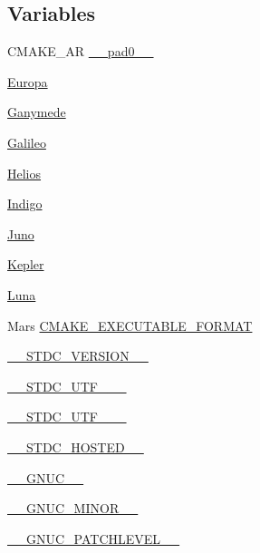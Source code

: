 \subsection*{Variables}
\begin{DoxyCompactItemize}
\item 
C\+M\+A\+K\+E\+\_\+\+AR \hyperlink{CMakeCache_8txt_a2b96b3598268f62908e4995dd2463817}{\+\_\+\+\_\+pad0\+\_\+\+\_\+}
\item 
\hyperlink{CMakeCache_8txt_af951d63fbd2687279cc11d69da292f84}{Europa}
\item 
\hyperlink{CMakeCache_8txt_a968842d0bd23649ddcb95bb35ee57943}{Ganymede}
\item 
\hyperlink{CMakeCache_8txt_a2b661fac6349ac2d6a6ff4f648ed0320}{Galileo}
\item 
\hyperlink{CMakeCache_8txt_ab16786d60187fbcb531b4443516567e1}{Helios}
\item 
\hyperlink{CMakeCache_8txt_a4f4af623496b1d087faf7dd53610d034}{Indigo}
\item 
\hyperlink{CMakeCache_8txt_a825301f1f1e1fc29d08c8697642b409b}{Juno}
\item 
\hyperlink{CMakeCache_8txt_a617415bd2b8666eca22af1168911ac78}{Kepler}
\item 
\hyperlink{CMakeCache_8txt_aa77580d5e01dbbd026207a21fccc6cda}{Luna}
\item 
Mars \hyperlink{CMakeCache_8txt_a84fcb39ad5095c6d2faadc7444971262}{C\+M\+A\+K\+E\+\_\+\+E\+X\+E\+C\+U\+T\+A\+B\+L\+E\+\_\+\+F\+O\+R\+M\+AT}
\item 
\hyperlink{CMakeCache_8txt_aba69e7d86e970c5454fedf7e25cbf49e}{\+\_\+\+\_\+\+S\+T\+D\+C\+\_\+\+V\+E\+R\+S\+I\+O\+N\+\_\+\+\_\+}
\item 
\hyperlink{CMakeCache_8txt_a391447bc12001cf307b9fec77d32c722}{\+\_\+\+\_\+\+S\+T\+D\+C\+\_\+\+U\+T\+F\+\_\+\_\+\+\_\+}
\item 
\hyperlink{CMakeCache_8txt_aebc193933efcf54801ba103bf6d12dbb}{\+\_\+\+\_\+\+S\+T\+D\+C\+\_\+\+U\+T\+F\+\_\+\_\+\+\_\+}
\item 
\hyperlink{CMakeCache_8txt_aacc78bc040f85bfc5d36eda8c048a1fe}{\+\_\+\+\_\+\+S\+T\+D\+C\+\_\+\+H\+O\+S\+T\+E\+D\+\_\+\+\_\+}
\item 
\hyperlink{CMakeCache_8txt_a4f955bfc59f2aa5f37123f7fa8c45974}{\+\_\+\+\_\+\+G\+N\+U\+C\+\_\+\+\_\+}
\item 
\hyperlink{CMakeCache_8txt_aefc5089d158028a655f8653d849ea643}{\+\_\+\+\_\+\+G\+N\+U\+C\+\_\+\+M\+I\+N\+O\+R\+\_\+\+\_\+}
\item 
\hyperlink{CMakeCache_8txt_a68c7f08caefc9a019e0b82ec6b3fa343}{\+\_\+\+\_\+\+G\+N\+U\+C\+\_\+\+P\+A\+T\+C\+H\+L\+E\+V\+E\+L\+\_\+\+\_\+}

\end{DoxyCompactItemize}
